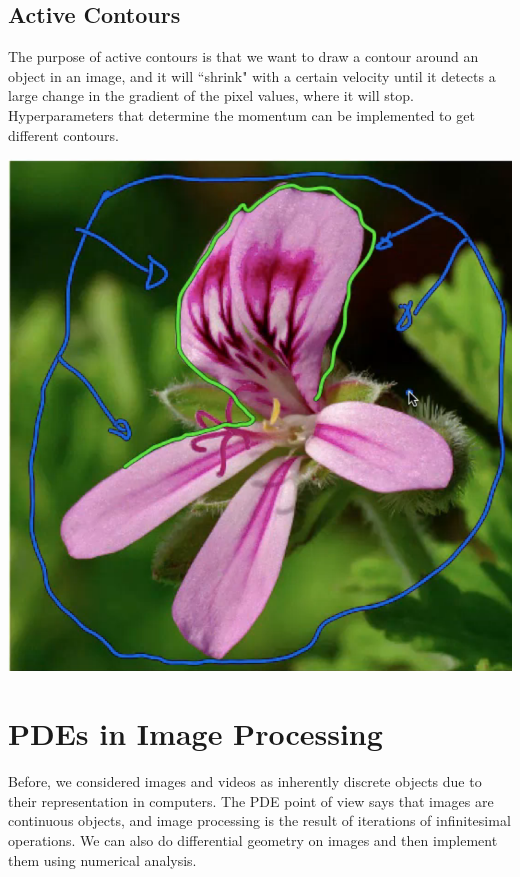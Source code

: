 \documentclass{article}
\begin{document}
  \subsection{Active Contours}

    The purpose of active contours is that we want to draw a contour around an object in an image, and it will ``shrink" with a certain velocity until it detects a large change in the gradient of the pixel values, where it will stop. Hyperparameters that determine the momentum can be implemented to get different contours. 
    \begin{center}
        \includegraphics[scale=0.2]{img/active_contours.png}
    \end{center}

\section{PDEs in Image Processing}

    Before, we considered images and videos as inherently discrete objects due to their representation in computers. The PDE point of view says that images are continuous objects, and image processing is the result of iterations of infinitesimal operations. We can also do differential geometry on images and then implement them using numerical analysis. 
\end{document}
